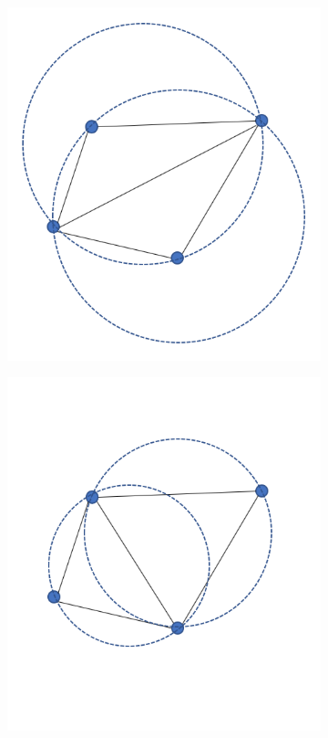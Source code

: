 \documentclass{article}
\begin{document}
\begin{figure}[h!] \label{fig:Delaunayflip}
  \centering
  \begin{subfigure}[b]{0.3\linewidth}
    \includegraphics[width=\linewidth]{Fig_Delaunayflip_01.png}
    \caption{}
  \end{subfigure}
  \begin{subfigure}[b]{0.3\linewidth}
    \includegraphics[width=\linewidth]{Fig_Delaunayflip_02.png}

\end{subfigure}
\end{figure}
\end{document}
